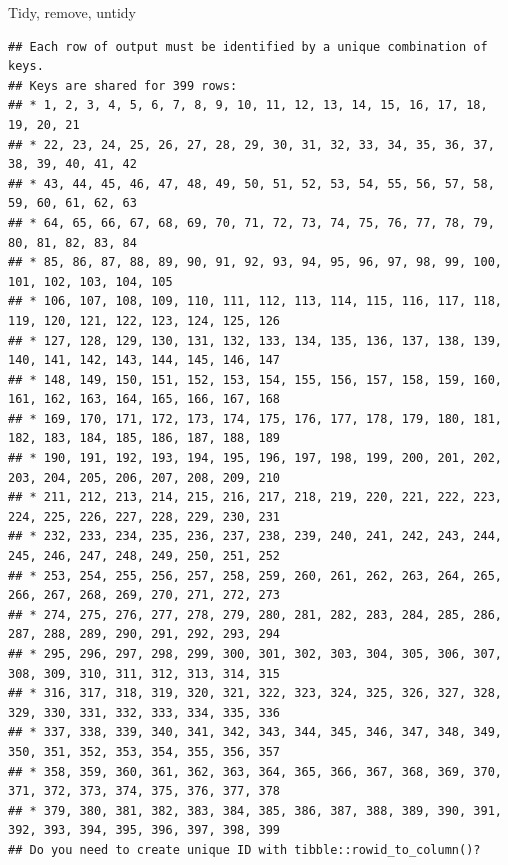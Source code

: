 \documentclass[ignorenonframetext,]{beamer}
\begin{document}
\begin{frame}[fragile]{Tidy, remove, untidy}
\begin{verbatim}
## Each row of output must be identified by a unique combination of keys.
## Keys are shared for 399 rows:
## * 1, 2, 3, 4, 5, 6, 7, 8, 9, 10, 11, 12, 13, 14, 15, 16, 17, 18, 19, 20, 21
## * 22, 23, 24, 25, 26, 27, 28, 29, 30, 31, 32, 33, 34, 35, 36, 37, 38, 39, 40, 41, 42
## * 43, 44, 45, 46, 47, 48, 49, 50, 51, 52, 53, 54, 55, 56, 57, 58, 59, 60, 61, 62, 63
## * 64, 65, 66, 67, 68, 69, 70, 71, 72, 73, 74, 75, 76, 77, 78, 79, 80, 81, 82, 83, 84
## * 85, 86, 87, 88, 89, 90, 91, 92, 93, 94, 95, 96, 97, 98, 99, 100, 101, 102, 103, 104, 105
## * 106, 107, 108, 109, 110, 111, 112, 113, 114, 115, 116, 117, 118, 119, 120, 121, 122, 123, 124, 125, 126
## * 127, 128, 129, 130, 131, 132, 133, 134, 135, 136, 137, 138, 139, 140, 141, 142, 143, 144, 145, 146, 147
## * 148, 149, 150, 151, 152, 153, 154, 155, 156, 157, 158, 159, 160, 161, 162, 163, 164, 165, 166, 167, 168
## * 169, 170, 171, 172, 173, 174, 175, 176, 177, 178, 179, 180, 181, 182, 183, 184, 185, 186, 187, 188, 189
## * 190, 191, 192, 193, 194, 195, 196, 197, 198, 199, 200, 201, 202, 203, 204, 205, 206, 207, 208, 209, 210
## * 211, 212, 213, 214, 215, 216, 217, 218, 219, 220, 221, 222, 223, 224, 225, 226, 227, 228, 229, 230, 231
## * 232, 233, 234, 235, 236, 237, 238, 239, 240, 241, 242, 243, 244, 245, 246, 247, 248, 249, 250, 251, 252
## * 253, 254, 255, 256, 257, 258, 259, 260, 261, 262, 263, 264, 265, 266, 267, 268, 269, 270, 271, 272, 273
## * 274, 275, 276, 277, 278, 279, 280, 281, 282, 283, 284, 285, 286, 287, 288, 289, 290, 291, 292, 293, 294
## * 295, 296, 297, 298, 299, 300, 301, 302, 303, 304, 305, 306, 307, 308, 309, 310, 311, 312, 313, 314, 315
## * 316, 317, 318, 319, 320, 321, 322, 323, 324, 325, 326, 327, 328, 329, 330, 331, 332, 333, 334, 335, 336
## * 337, 338, 339, 340, 341, 342, 343, 344, 345, 346, 347, 348, 349, 350, 351, 352, 353, 354, 355, 356, 357
## * 358, 359, 360, 361, 362, 363, 364, 365, 366, 367, 368, 369, 370, 371, 372, 373, 374, 375, 376, 377, 378
## * 379, 380, 381, 382, 383, 384, 385, 386, 387, 388, 389, 390, 391, 392, 393, 394, 395, 396, 397, 398, 399
## Do you need to create unique ID with tibble::rowid_to_column()?
\end{verbatim}

\end{frame}
\end{document}
